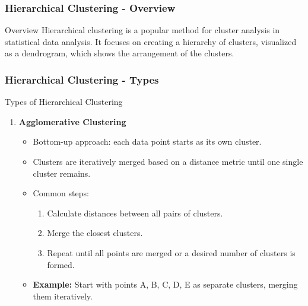 \documentclass[aspectratio=169]{beamer}
\begin{document}
\begin{frame}[fragile]
    \frametitle{Hierarchical Clustering - Overview}
    \begin{block}{Overview}
        Hierarchical clustering is a popular method for cluster analysis in statistical data analysis. 
        It focuses on creating a hierarchy of clusters, visualized as a dendrogram, which shows the arrangement of the clusters.
    \end{block}
\end{frame}

\begin{frame}[fragile]
    \frametitle{Hierarchical Clustering - Types}
    \begin{block}{Types of Hierarchical Clustering}
        \begin{enumerate}
            \item \textbf{Agglomerative Clustering}
            \begin{itemize}
                \item Bottom-up approach: each data point starts as its own cluster.
                \item Clusters are iteratively merged based on a distance metric until one single cluster remains.
                \item Common steps:
                \begin{enumerate}
                    \item Calculate distances between all pairs of clusters.
                    \item Merge the closest clusters.
                    \item Repeat until all points are merged or a desired number of clusters is formed.
                \end{enumerate}
                \item \textbf{Example:} Start with points A, B, C, D, E as separate clusters, merging them iteratively.
            \end{itemize}
            

\end{enumerate}
\end{block}
\end{frame}
\end{document}
